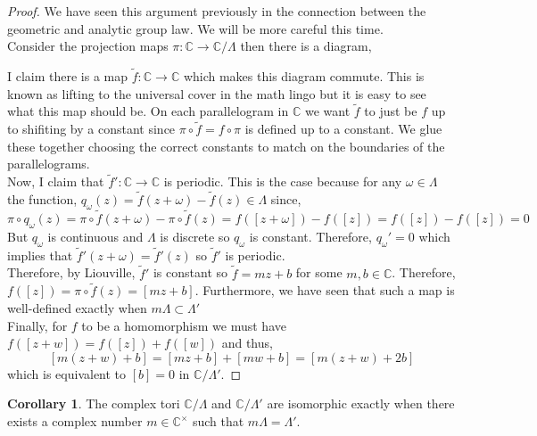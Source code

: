 \documentclass{article}
\newcommand{\C}{\mathbb{C}}
\theoremstyle{definition}
\newtheorem{corollary}[theorem]{Corollary}
\begin{document}
\begin{proof}
We have seen this argument previously in the connection between the geometric and analytic group law. We will be more careful this time. 
\bigskip\\
Consider the projection maps $\pi : \C \to \C / \Lambda$ then there is a diagram,
\begin{center}
\end{center}
I claim there is a map $\tilde{f} : \C \to \C$ which makes this diagram commute. This is known as lifting to the universal cover in the math lingo but it is easy to see what this map should be. On each parallelogram in $\C$ we want $\tilde{f}$ to just be $f$ up to shifiting by a constant since $\pi \circ \tilde{f} = f \circ \pi$ is defined up to a constant. We glue these together choosing the correct constants to match on the boundaries of the parallelograms.  
\bigskip\\
Now, I claim that $\tilde{f}' : \C \to \C$ is periodic. This is the case because for any $\omega \in \Lambda$ the function, $q_\omega(z) = \tilde{f}(z + \omega) - \tilde{f}(z) \in \Lambda$ since,
\[ \pi \circ q_\omega(z) = \pi \circ \tilde{f}(z + \omega) - \pi \circ \tilde{f}(z) = f([z + \omega]) - f([z]) = f([z]) - f([z]) = 0 \]
But $q_\omega$ is continuous and $\Lambda$ is discrete so $q_\omega$ is constant. Therefore, $q_\omega' = 0$ which implies that $\tilde{f}'(z + \omega) = \tilde{f}'(z)$ so $\tilde{f}'$ is periodic. 
\bigskip\\
Therefore, by Liouville, $\tilde{f}'$ is constant so $\tilde{f} = m z + b$ for some $m,b \in \C$. Therefore, $f([z]) = \pi \circ \tilde{f}(z) = [m z + b]$. Furthermore, we have seen that such a map is well-defined exactly when $m \Lambda \subset \Lambda'$
\bigskip\\
Finally, for $f$ to be a homomorphism we must have $f([z + w]) = f([z]) + f([w])$ and thus,
\[ [m(z + w) + b] = [m z + b] + [m w + b] = [m (z + w) + 2 b] \]
which is equivalent to $[b] = 0$ in $\C / \Lambda'$. 
\end{proof}


\begin{corollary}
The complex tori $\C / \Lambda$ and $\C / \Lambda'$ are isomorphic exactly when there exists a complex number $m \in \C^\times$ such that $m \Lambda = \Lambda'$.
\end{corollary}
\end{document}
